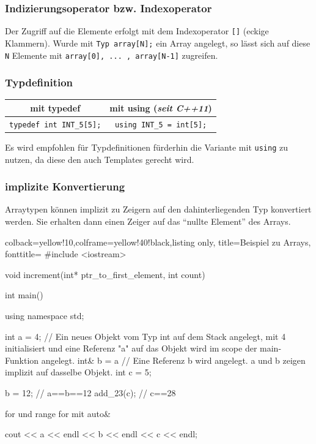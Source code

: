 \documentclass[a4paper]{report}
\begin{document}
\subsubsection{Indizierungsoperator bzw. Indexoperator}

Der Zugriff auf die Elemente erfolgt mit dem Indexoperator \texttt{[]} (eckige Klammern). Wurde mit \texttt{Typ array[N];} ein Array angelegt, so lässt sich auf diese \texttt{N} Elemente mit \texttt{array[0], ... , array[N-1]} zugreifen.

\subsubsection{Typdefinition}
\begin{center}
\begin{tabular}{|c|c|} \hline
	\textbf{mit typedef} & \textbf{mit using {\small (\textit{seit C++11})}} \\ \hline
	\texttt{typedef int INT\_5[5];} & \texttt{using INT\_5 = int[5];} \\ \hline
\end{tabular}
\end{center}

Es wird empfohlen für Typdefinitionen fürderhin die Variante mit \texttt{using} zu nutzen, da diese den auch Templates gerecht wird. 

\subsubsection{implizite Konvertierung}

Arraytypen können implizit zu Zeigern auf den dahinterliegenden Typ konvertiert werden. Sie erhalten dann einen Zeiger auf das "`nullte Element"' des Arrays.

\begin{tcblisting}{colback=yellow!10,colframe=yellow!40!black,listing only,
		title=Beispiel zu Arrays, fonttitle=\bfseries}
	#include <iostream>
	
	void increment(int* ptr_to_first_element, int count){
		
	}
	
	int main(){
		using namespace std;
		
		int a = 4; // Ein neues Objekt vom Typ int auf dem Stack angelegt, mit 4 initialisiert und eine Referenz "a" auf das Objekt wird im scope der main-Funktion angelegt.
		int& b = a // Eine Referenz b wird angelegt. a und b zeigen implizit auf dasselbe Objekt.
		int c = 5;
		
		b = 12; // a==b==12
		add_23(c); // c==28
		
		for und range for mit auto&
		
		cout << a << endl << b << endl << c << endl; 
	}
\end{tcblisting}
\end{document}
